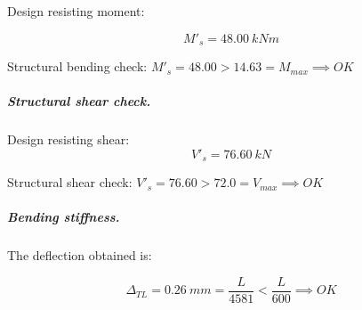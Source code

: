 \noindent Design resisting moment:

\begin{equation}
  M'_s= 48.00\ kN m
\end{equation}

\noindent Structural bending check: $M'_s = 48.00 > 14.63 = M_{max} \implies OK$

\subparagraph{Structural shear check.}

\noindent Design resisting shear:
\begin{equation}
  V'_s= 76.60\ kN
\end{equation}

\noindent Structural shear check: $V'_s = 76.60 > 72.0 = V_{max} \implies OK$

\subparagraph{Bending stiffness.}
The deflection obtained is:

\begin{equation}
  \Delta_{TL}= 0.26\ mm= \frac{L}{4581} < \frac{L}{600} \implies OK
\end{equation}


